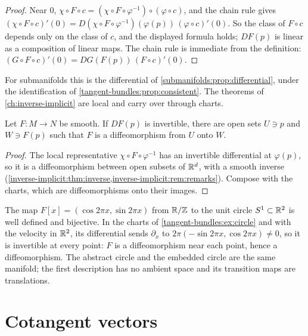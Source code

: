 \begin{notechapter}
\begin{proof}
Near $0$, $\chi\circ F\circ c
= (\chi\circ F\circ\varphi^{-1})\circ(\varphi\circ c)$, and the chain
rule gives
$(\chi\circ F\circ c)'(0)
= D(\chi\circ F\circ\varphi^{-1})(\varphi(p))\,(\varphi\circ c)'(0)$. So
the class of $F\circ c$ depends only on the class of $c$, and the
displayed formula holds; $DF(p)$ is linear as a composition of linear
maps. The chain rule is immediate from the definition:
$(G\circ F\circ c)'(0) = DG(F(p))\,(F\circ c)'(0)$.
\end{proof}

For submanifolds this is the differential of
\cref{submanifolds:prop:differential}, under the identification of
\cref{tangent-bundles:prop:consistent}. The theorems of
\cref{ch:inverse-implicit} are local and carry over through charts.

\begin{theorem}
\label{tangent-bundles:thm:inverse}
Let $F:M\to N$ be smooth. If $DF(p)$ is invertible, there are open sets
$U\ni p$ and $W\ni F(p)$ such that $F$ is a diffeomorphism from $U$ onto
$W$.
\end{theorem}

\begin{proof}
The local representative $\chi\circ F\circ\varphi^{-1}$ has an invertible
differential at $\varphi(p)$, so it is a diffeomorphism between open
subsets of $\mathbb{R}^d$, with a smooth inverse
(\cref{inverse-implicit:thm:inverse,inverse-implicit:rem:remarks}).
Compose with the charts, which are diffeomorphisms onto their images.
\end{proof}

\begin{example}\label{tangent-bundles:ex:s1}
The map $F[x] = (\cos2\pi x, \sin2\pi x)$ from $\mathbb{R}/\mathbb{Z}$ to the unit circle
$S^1\subset\mathbb{R}^2$ is well defined and bijective. In the charts of
\cref{tangent-bundles:ex:circle} and with the velocity in $\mathbb{R}^2$, its
differential sends $\partial_x$ to
$2\pi(-\sin2\pi x, \cos2\pi x)\neq0$, so it is invertible at every point:
$F$ is a diffeomorphism near each point, hence a diffeomorphism. The
abstract circle and the embedded circle are the same manifold; the first
description has no ambient space and its transition maps are
translations.
\end{example}

\section{Cotangent vectors}\label{tangent-bundles:sec:cotangent}


\end{notechapter}

